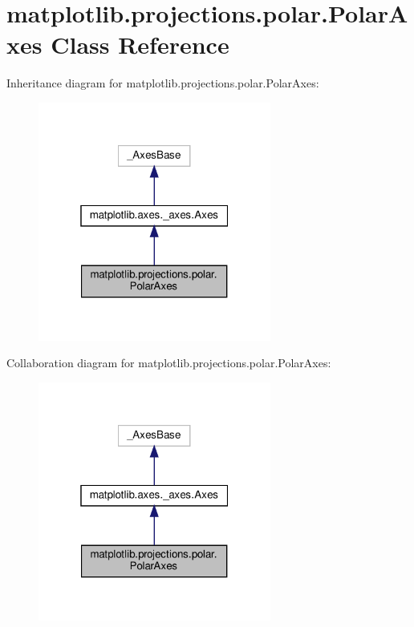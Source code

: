 \hypertarget{classmatplotlib_1_1projections_1_1polar_1_1PolarAxes}{}\section{matplotlib.\+projections.\+polar.\+Polar\+Axes Class Reference}
\label{classmatplotlib_1_1projections_1_1polar_1_1PolarAxes}


Inheritance diagram for matplotlib.\+projections.\+polar.\+Polar\+Axes\+:
\nopagebreak
\begin{figure}[H]
\begin{center}
\leavevmode
\includegraphics[width=217pt]{classmatplotlib_1_1projections_1_1polar_1_1PolarAxes__inherit__graph}
\end{center}
\end{figure}


Collaboration diagram for matplotlib.\+projections.\+polar.\+Polar\+Axes\+:
\nopagebreak
\begin{figure}[H]
\begin{center}
\leavevmode
\includegraphics[width=217pt]{classmatplotlib_1_1projections_1_1polar_1_1PolarAxes__coll__graph}
\end{center}
\end{figure}
